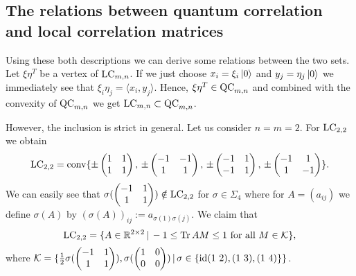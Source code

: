 \subsection{The relations between quantum correlation and local correlation matrices}

Using these both descriptions we can derive some relations between the two sets. 
Let $ \xi\eta^T $ be a vertex of $ \textup{LC}_{m,n} $. If we just choose $ x_i = \xi_i \ket{0}$ and $ y_j = \eta_j\ket{0} $ we immediately see that $ \xi_i\eta_j = \langle x_i, y_j \rangle $. Hence, $ \xi\eta^T \in \textup{QC}_{m,n} $ and combined with the convexity of $ \textup{QC}_{m,n} $ we get $ \textup{LC}_{m,n} \subset \textup{QC}_{m,n} $.

However, the inclusion is strict in general. Let us consider $ n=m=2 $. 
For $ \textup{LC}_{2,2} $ we obtain 
\begin{align*}
	\textup{LC}_{2,2}= \textup{conv} \{ \pm \begin{pmatrix}
	1 & 1 \\
	1 & 1
	\end{pmatrix} , \, \pm \begin{pmatrix}
	-1 & -1 \\
	1 & 1
	\end{pmatrix} , \, \pm \begin{pmatrix}
	-1 & 1 \\
	-1 & 1
	\end{pmatrix}, \, \pm \begin{pmatrix}
	-1 & 1 \\
	1 & -1
	\end{pmatrix}  \}.
\end{align*}
We can easily see that $ \sigma(\begin{pmatrix}
-1 & 1 \\ 1 & 1 
\end{pmatrix}) \notin \textup{LC}_{2,2} $ for $ \sigma \in \Sigma_4 $ where for $ A = (a_{ij}) $ we define $ \sigma (A)  $ by $ (\sigma( A))_{ij}:= a_{\sigma(1)\sigma(j)} $.
We claim that
\begin{equation}\label{facetsLC}
	\textup{LC}_{2,2} = \{ A \in \mathbb{R}^{2 \times 2} \, | \, -1 \le  \text{Tr} \, {AM}  \le 1 \textup{ for all } M \in \mathcal{K} \},
\end{equation}
where $ \mathcal{K}  = \{ \frac{1}{2}\sigma(\begin{pmatrix}
-1 & 1 \\
1 & 1
\end{pmatrix}), \sigma(\begin{pmatrix}
1 & 0 \\
0 & 0
\end{pmatrix}) \, | \,  \sigma \in \{ \textup{id} (1 \, \, 2), (1 \, \, 3), (1 \, \, 4) \} \} $.
